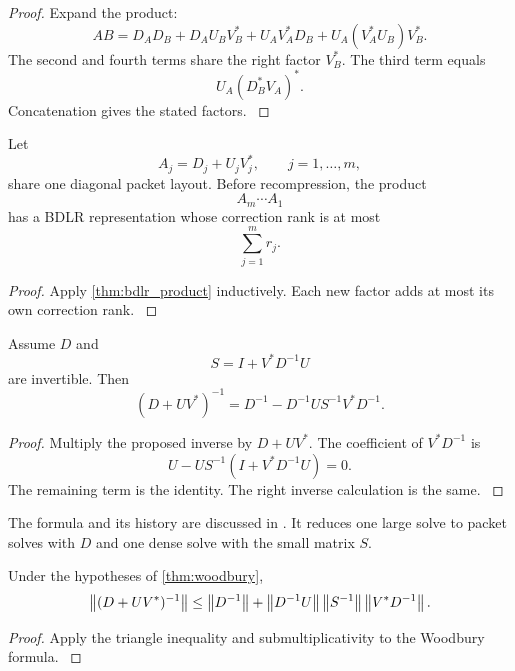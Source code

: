 \begin{proof}\label{main:proof:019}
Expand the product:
\[
AB
=
D_AD_B
+D_AU_BV_B^*
+U_AV_A^*D_B
+U_A(V_A^*U_B)V_B^*.
\]
The second and fourth terms share the right factor \(V_B^*\). The third term equals
\[
U_A(D_B^*V_A)^*.
\]
Concatenation gives the stated factors.
\label{main:proof:019:end}\end{proof}

\begin{corollary}\label{main:corollary:006}\label{cor:rank_growth}
Let
\[
A_j=D_j+U_jV_j^*,
\qquad
j=1,\ldots,m,
\]
share one diagonal packet layout. Before recompression, the product
\[
A_m\cdots A_1
\]
has a BDLR representation whose correction rank is at most
\[
\boxed{
\sum_{j=1}^m r_j.
}
\]
\end{corollary}

\begin{proof}\label{main:proof:020}
Apply \cref{thm:bdlr_product} inductively. Each new factor adds at most its own correction rank.
\label{main:proof:020:end}\end{proof}

\begin{theorem}\label{main:theorem:010}\label{thm:woodbury}
Assume \(D\) and
\[
S=I+V^*D^{-1}U
\]
are invertible. Then
\[
\boxed{
(D+UV^*)^{-1}
=
D^{-1}
-D^{-1}US^{-1}V^*D^{-1}.
}
\]
\end{theorem}

\begin{proof}\label{main:proof:021}
Multiply the proposed inverse by \(D+UV^*\). The coefficient of \(V^*D^{-1}\) is
\[
U-US^{-1}(I+V^*D^{-1}U)=0.
\]
The remaining term is the identity. The right inverse calculation is the same.
\label{main:proof:021:end}\end{proof}

The formula and its history are discussed in \cite{Hager1989}. It reduces one large solve to packet solves with \(D\) and one dense solve with the small matrix \(S\).

\begin{corollary}\label{main:corollary:007}\label{cor:inverse_norm}
Under the hypotheses of \cref{thm:woodbury},
\[
\left\lVert(D+UV^*)^{-1}\right\rVert
\leq
\left\lVert D^{-1}\right\rVert
+
\left\lVert D^{-1}U\right\rVert
\left\lVert S^{-1}\right\rVert
\left\lVert V^*D^{-1}\right\rVert.
\]
\end{corollary}

\begin{proof}\label{main:proof:022}
Apply the triangle inequality and submultiplicativity to the Woodbury formula.
\label{main:proof:022:end}\end{proof}


